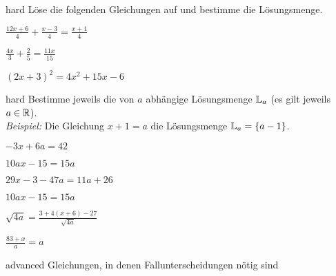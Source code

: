\documentclass[../lineare_gleichungen.tex]{subfiles}
\begin{document}
    \begin{exercise}{hard}
        Löse die folgenden Gleichungen auf und bestimme die Lösungsmenge.
        \vspace{2mm}

        \begin{enumerate}
            \begin{multicols}{3}
                \item $\frac{12x+6}{4}+\frac{x-3}{4}=\frac{x+1}{4}$
                \item $\frac{4x}{3}+\frac{2}{5}=\frac{11x}{15}$
                \item $(2x+3)^2=4x^2+15x-6$
            \end{multicols}
        \end{enumerate}
    \end{exercise}
    \begin{exercise}{hard}
        Bestimme jeweils die von $a$ abhängige Lösungsmenge $\mathbb{L}_a$ (es gilt jeweils $a\in\mathbb{R}$).\\
        \emph{Beispiel:} Die Gleichung $x+1=a$ die Lösungsmenge $\mathbb{L}_a=\{a-1\}$.
        \vspace{2mm}

        \begin{enumerate}
            \begin{multicols}{3}
                \item $-3x+6a=42$
                \item $10ax-15=15a$
                \item $29x-3-47a=11a+26$
                \item $10ax-15=15a$
                \item $\sqrt{4a}=\frac{3+4(x+6)-27}{\sqrt{4a}}$
                \item $\frac{83+x}{a}=a$
            \end{multicols}
        \end{enumerate}
    \end{exercise}
    \begin{exercise}{advanced}
        Gleichungen, in denen Fallunterscheidungen nötig sind
    \end{exercise}
\end{document}
